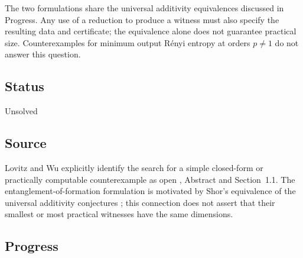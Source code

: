 The two formulations share the universal additivity equivalences discussed in Progress. Any use of a reduction to produce a witness must also specify the resulting data and certificate; the equivalence alone does not guarantee practical size. Counterexamples for minimum output R\'enyi entropy at orders $p\ne1$ do not answer this question.

\subsection*{Status}

Unsolved

\subsection*{Source}

Lovitz and Wu explicitly identify the search for a simple closed-form or practically computable counterexample as open , Abstract and Section~1.1. The entanglement-of-formation formulation is motivated by Shor's equivalence of the universal additivity conjectures ; this connection does not assert that their smallest or most practical witnesses have the same dimensions.

\subsection*{Progress}

